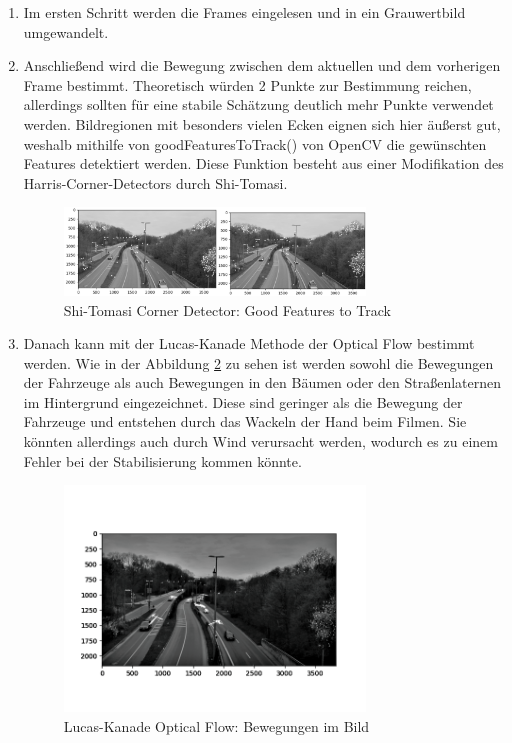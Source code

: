 \documentclass[conference]{IEEEtran}
\begin{document}
	\begin{enumerate}
		\item Im ersten Schritt werden die Frames eingelesen und in ein Grauwertbild umgewandelt.
		
		\item Anschließend wird die Bewegung zwischen dem aktuellen und dem vorherigen Frame bestimmt. Theoretisch würden 2 Punkte zur Bestimmung reichen, allerdings sollten für eine stabile Schätzung deutlich mehr Punkte verwendet werden.
		Bildregionen mit besonders vielen Ecken eignen sich hier äußerst gut, weshalb mithilfe von goodFeaturesToTrack() von OpenCV die gewünschten Features detektiert werden.
		Diese Funktion besteht aus einer Modifikation des Harris-Corner-Detectors durch Shi-Tomasi.
		\begin{figure}[!h]
			\begin{center}
				\includegraphics[width=8cm]{Media/VideoStab.png}
				\caption{Shi-Tomasi Corner Detector: Good Features to Track}
				\label{VS1}
			\end{center}
		\end{figure}
		
		\item Danach kann mit der Lucas-Kanade Methode der Optical Flow bestimmt werden. Wie in der Abbildung \ref{VS2} zu sehen ist werden sowohl die Bewegungen der Fahrzeuge als auch Bewegungen in den Bäumen oder den Straßenlaternen im Hintergrund eingezeichnet. Diese sind geringer als die Bewegung der Fahrzeuge und entstehen durch das Wackeln der Hand beim Filmen. Sie könnten allerdings auch durch Wind verursacht werden, wodurch es zu einem Fehler bei der Stabilisierung kommen könnte.
		
		\begin{figure}[!h]
			\begin{center}
				\includegraphics[width=8cm]{Media/VideoStab2.png}
				\caption{Lucas-Kanade Optical Flow: Bewegungen im Bild}
				\label{VS2}
			\end{center}
		\end{figure}
		

\end{enumerate}
\end{document}

